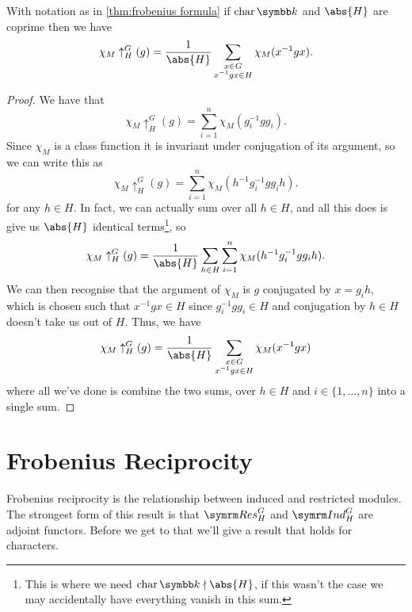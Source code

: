 \begin{crl}{}{}
    With notation as in \cref{thm:frobenius formula} if \(\Char \field\) and \(\abs{H}\) are coprime then we have
    \begin{equation}
        \chi_M\uparrow^G_H(g) = \frac{1}{\abs{H}} \sum_{\substack{x \in G\\ x^{-1}gx \in H}} \chi_M(x^{-1} g x).
    \end{equation}
    \begin{proof}
        We have that
        \begin{equation}
            \chi_M\uparrow^G_H(g) = \sum_{i=1}^n \chi_M(g_i^{-1}gg_i).
        \end{equation}
        Since \(\chi_M\) is a class function it is invariant under conjugation of its argument, so we can write this as
        \begin{equation}
            \chi_M\uparrow^G_H(g) = \sum_{i=1}^n \chi_M(h^{-1}g_i^{-1}gg_ih).
        \end{equation}
        for any \(h \in H\).
        In fact, we can actually sum over all \(h \in H\), and all this does is give us \(\abs{H}\) identical terms\footnote{This is where we need \(\Char \field \nmid \abs{H}\), if this wasn't the case we may accidentally have everything vanish in this sum.}, so
        \begin{equation}
            \chi_M\uparrow^G_H(g) = \frac{1}{\abs{H}} \sum_{h \in H} \sum_{i=1}^n \chi_M(h^{-1}g_i^{-1}gg_ih).
        \end{equation}
        We can then recognise that the argument of \(\chi_M\) is \(g\) conjugated by \(x = g_i h\), which is chosen such that \(x^{-1}gx \in H\) since \(g_i^{-1}gg_i \in H\) and conjugation by \(h \in H\) doesn't take us out of \(H\).
        Thus, we have
        \begin{equation}
            \chi_M\uparrow^G_H(g) = \frac{1}{\abs{H}} \sum_{\substack{x \in G\\ x^{-1}gx \in H}} \chi_M(x^{-1}gx)
        \end{equation}
        where all we've done is combine the two sums, over \(h \in H\) and \(i \in \{1, \dotsc, n\}\) into a single sum.
    \end{proof}
\end{crl}

\section{Frobenius Reciprocity}
Frobenius reciprocity is the relationship between induced and restricted modules.
The strongest form of this result is that \(\Res^G_H\) and \(\Ind^G_H\) are adjoint functors.
Before we get to that we'll give a result that holds for characters.


